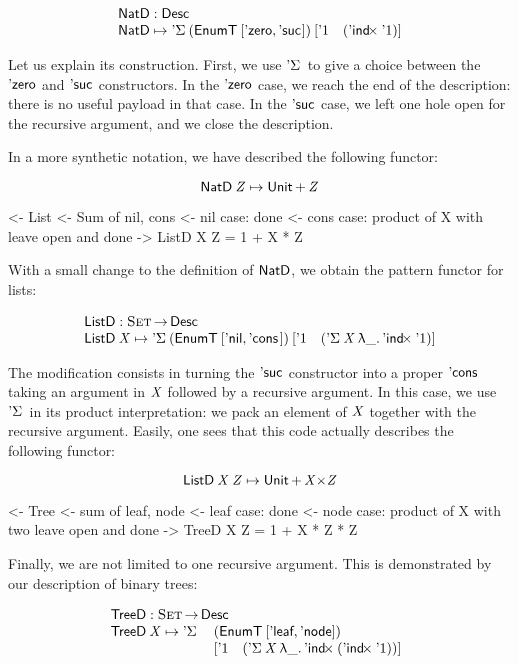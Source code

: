 \[\stk{
\NatD : \Desc \\
\NatD \mapsto \DSigma{(\EnumT{[ \NatZero, \NatSuc{\!} ]})}
                     {[ \DUnit \quad (\DIndx{\DUnit}) ]}
}\]

Let us explain its construction. First, we use $\DSigma{\!}{\!}$ to
give a choice between the $\NatZero$ and $\NatSuc{\!}$ constructors. In
the $\NatZero$ case, we reach the end of the description: there is no
useful payload in that case. In the $\NatSuc{\!}$ case, we left one hole
open for the recursive argument, and we close the description.

In a more synthetic notation, we have described the following functor:

\[    \NatD\: \V{Z} \mapsto \Unit \mathop{\D{+}} \V{Z}    \]

\begin{wstructure}
<- List
    <- Sum of nil, cons
    <- nil case: done
    <- cons case: product of X with leave open and done
    -> ListD X Z = 1 + X * Z
\end{wstructure}

With a small change to the definition of $\NatD$, we obtain the
pattern functor for lists:

\[\stk{
\ListD : \Set \To \Desc \\
\ListD \: \V{X} \mapsto \DSigma{(\EnumT{[ \ListNil, \ListCons{\!}{\!} ]})}
                           {[ \DUnit \quad (\DSigma{\V{X}}{\LAM{\_} \DIndx{\DUnit}}) ]}
}\]


The modification consists in turning the $\NatSuc{\!}$ constructor
into a proper $\ListCons{\!}{\!}$ taking an argument in $\V{X}$
followed by a recursive argument. In this case, we use
$\DSigma{\!}{\!}$ in its product interpretation: we pack an element of
$\V{X}$ together with the recursive argument. Easily, one sees that
this code actually describes the following functor:

\[    \ListD\: \V{X}\: \V{Z} \mapsto \Unit \mathop{\D{+}} \V{X} \D{\ensuremath{\times}} \V{Z}     \]

\begin{wstructure}
<- Tree
    <- sum of leaf, node
    <- leaf case: done
    <- node case: product of X with two leave open and done
    -> TreeD X Z = 1 + X * Z * Z
\end{wstructure}

Finally, we are not limited to one recursive argument. This is
demonstrated by our description of binary trees:

\[\stk{
\TreeD : \Set \To \Desc \\
\begin{array}{@{}ll}
\TreeD \: \V{X} \mapsto \DSigma{ & (\EnumT{[ \TreeLeaf, \TreeNode ]}) \\}
                           { & [ \DUnit \quad (\DSigma{\V{X}}{\LAM{\_} \DIndx{(\DIndx{\DUnit})}}) ]}
\end{array}
}\]

